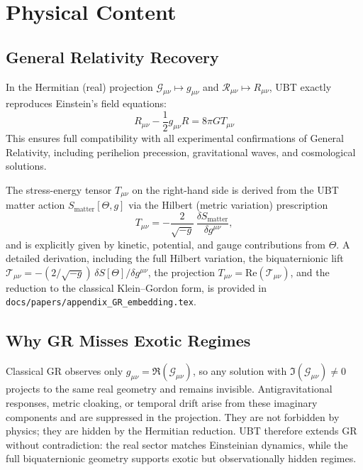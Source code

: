 \documentclass[12pt]{article}
\begin{document}
\section{Physical Content}

\subsection{General Relativity Recovery}

In the Hermitian (real) projection $\mathcal{G}_{\mu\nu}\mapsto g_{\mu\nu}$ and $\mathcal{R}_{\mu\nu}\mapsto R_{\mu\nu}$, UBT exactly reproduces Einstein's field equations:
\begin{equation}
R_{\mu\nu} - \frac{1}{2}g_{\mu\nu}R = 8\pi G T_{\mu\nu}
\end{equation}
This ensures full compatibility with all experimental confirmations of General Relativity, including perihelion precession, gravitational waves, and cosmological solutions.

The stress-energy tensor $T_{\mu\nu}$ on the right-hand side is derived from the UBT matter action $S_{\mathrm{matter}}[\Theta, g]$ via the Hilbert (metric variation) prescription
\[
  T_{\mu\nu} = -\frac{2}{\sqrt{-g}}\,\frac{\delta S_{\mathrm{matter}}}{\delta g^{\mu\nu}},
\]
and is explicitly given by kinetic, potential, and gauge contributions from $\Theta$.
A detailed derivation, including the full Hilbert variation, the biquaternionic lift
$\mathcal{T}_{\mu\nu} = -(2/\sqrt{-g})\,\delta S[\Theta]/\delta g^{\mu\nu}$,
the projection $T_{\mu\nu} = \mathrm{Re}(\mathcal{T}_{\mu\nu})$, and the reduction
to the classical Klein--Gordon form, is provided in
\texttt{docs/papers/appendix\_GR\_embedding.tex}.

\subsection{Why GR Misses Exotic Regimes}

Classical GR observes only $g_{\mu\nu}=\Re(\mathcal{G}_{\mu\nu})$, so any solution with $\Im(\mathcal{G}_{\mu\nu})\neq 0$ projects to the same real geometry and remains invisible. Antigravitational responses, metric cloaking, or temporal drift arise from these imaginary components and are suppressed in the projection. They are not forbidden by physics; they are hidden by the Hermitian reduction. UBT therefore extends GR without contradiction: the real sector matches Einsteinian dynamics, while the full biquaternionic geometry supports exotic but observationally hidden regimes.
\end{document}
